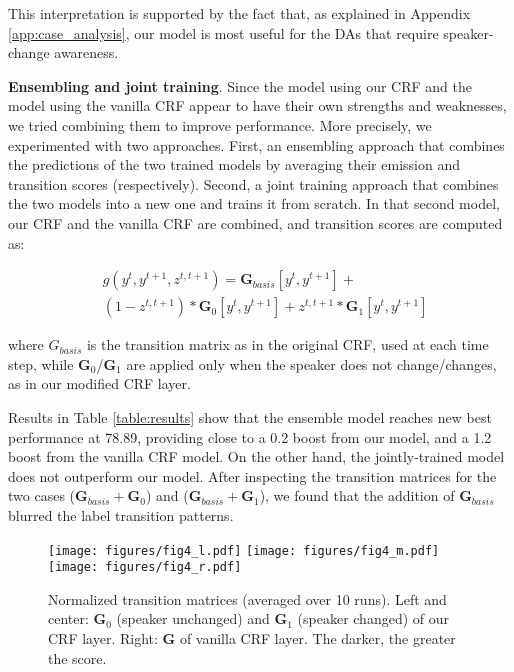 \documentclass[11pt,a4paper]{article}
\begin{document}
This interpretation is supported by the fact that, as explained in Appendix \ref{app:case_analysis}, our model is most useful for the DAs that require speaker-change awareness.

\noindent \textbf{Ensembling and joint training}.
Since the model using our CRF and the model using the vanilla CRF appear to have their own strengths and weaknesses, we tried combining them to improve performance.
More precisely, we experimented with two approaches.
First, an ensembling approach that combines the predictions of the two trained models by averaging their emission and transition scores (respectively).
Second, a joint training approach that combines the two models into a new one and trains it from scratch.
In that second model, our CRF and the vanilla CRF are combined, and transition scores are computed as:

{\small
\setlength{\abovedisplayskip}{-3pt}
\setlength{\belowdisplayskip}{3pt}
\begin{align}
    &g(y^t,y^{t+1},z^{t,t+1}) = \mathbf{G}_{basis}[y^t,y^{t+1}] +  \\
    &(1-z^{t,t+1})*\mathbf{G}_0[y^t,y^{t+1}] + z^{t,t+1}*\mathbf{G}_1[y^t,y^{t+1}] \nonumber
\end{align}
}

\noindent where ${G}_{basis}$ is the transition matrix as in the original CRF, used at each time step, while $\mathbf{G}_0$/$\mathbf{G}_1$ are applied only when the speaker does not change/changes, as in our modified CRF layer.

Results in Table \ref{table:results} show that the ensemble model reaches new best performance at 78.89, providing close to a 0.2 boost from our model, and a 1.2 boost from the vanilla CRF model.
On the other hand, the jointly-trained model does not outperform our model.
After inspecting the transition matrices for the two cases ($\mathbf{G}_{basis}+\mathbf{G}_{0}$) and ($\mathbf{G}_{basis}+\mathbf{G}_{1}$), we found that the addition of $\mathbf{G}_{basis}$ blurred the label transition patterns.

\begin{figure*}[ht]

\centering
\texttt{[image: figures/fig4\_l.pdf]}
\texttt{[image: figures/fig4\_m.pdf]} \hspace{0.15cm}
\texttt{[image: figures/fig4\_r.pdf]}

\caption{Normalized transition matrices (averaged over 10 runs). Left and center: $\mathbf{G}_0$ (speaker unchanged) and $\mathbf{G}_1$ (speaker changed) of our CRF layer. Right: $\mathbf{G}$ of vanilla CRF layer.
The darker, the greater the score. \label{fig:transition}}
\end{figure*}
\end{document}
